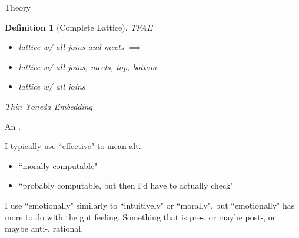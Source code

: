 \documentclass[
	fontsize=10pt, %
	twoside=false, %
	secnumdepth=-1, %
]{kaobook}
\theoremstyle{break}
\newtheorem*{Def}{Definition} %
\begin{document}
    \See Theory
    \begin{Def}[Complete Lattice]
        TFAE
        \begin{itemize}
            \item lattice w/ all joins and meets $⟹ $
            \item lattice w/ all joins, meets, top, bottom
            \item lattice w/ all joins
        \end{itemize}

        \See Thin Yoneda Embedding
    \end{Def}
    An .

    I typically use ``effective" to mean alt.
    \begin{itemize}
        \item ``morally computable"
        \item ``probably computable, but then I'd have to actually check"
    \end{itemize}
    I use ``emotionally" similarly to ``intuitively" or ``morally",
    but ``emotionally" has more to do with the gut feeling.
    Something that is pre-, or maybe post-, or maybe anti-, rational.
\end{document}

